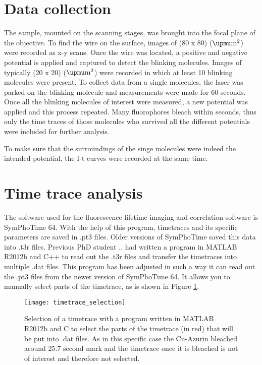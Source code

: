 \documentclass[twoside,single]{lion-msc}
\begin{document}
\section*{Data collection} \label{data_coll}
The sample, mounted on the scanning stages, was brought into the focal plane of the objective. To find the wire on the surface, images of (80 x 80) ($\upmu \textup{m}^{2}$) were recorded as x-y scans. Once the wire was located, a positive and negative potential is applied and captured to detect the blinking molecules. Images of typically (20 x 20) ($\upmu \textup{m}^{2}$) were recorded in which at least 10 blinking molecules were present. To collect data from a single molecules, the laser was parked on the blinking molecule and measurements were made for 60 seconds. Once all the blinking molecules of interest were measured, a new potential was applied and this process repeated. Many fluorophores bleach within seconds, thus only the time traces of those molecules who survived all the different potentials were included for further analysis. 

To make sure that the surroundings of the singe molecules were indeed the intended potential, the I-t curves were recorded at the same time.


\section*{Time trace analysis}
The software used for the fluorescence lifetime imaging and correlation software is SymPhoTime 64. With the help of this program, timetraces and its specific parameters are saved in .pt3 files. Older versions of SymPhoTime saved this data into .t3r files. Previous PhD student .. had written a program in MATLAB R2012b and C++ to read out the .t3r files and transfer the timetraces into multiple .dat files. This program has been adjusted in such a way it can read out the .pt3 files from the newer version of SymPhoTime 64. It allows you to manually select parts of the timetrace, as is shown in Figure \ref{timetrace_selection}.

\begin{figure}[ht!]
\centering
\texttt{[image: timetrace\_selection]}
\caption{Selection of a timetrace with a program written in MATLAB R2012b and C to select the parts of the timetrace (in red) that will be put into .dat files. As in this specific case the Cu-Azurin bleached around 25.7 second mark and the timetrace once it is bleached is not of interest and therefore not selected.}
\label{timetrace_selection}
\end{figure}
\end{document}
